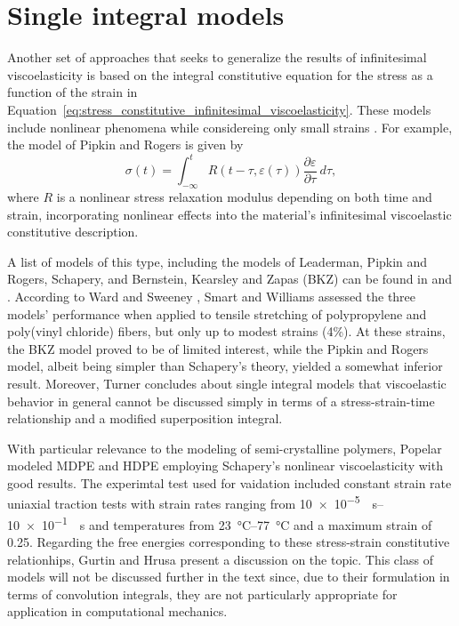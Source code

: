\section{Single integral models}
Another set of approaches that seeks to generalize the results of infinitesimal viscoelasticity is based on the integral constitutive equation for the stress as a function of the strain in Equation~\eqref{eq:stress_constitutive_infinitesimal_viscoelasticity}.
These models include nonlinear phenomena while considereing only small strains \citep{wardIntroductionMechanicalProperties2004}.
For example, the model of Pipkin and Rogers is given by \citep{wardIntroductionMechanicalProperties2004}
\begin{equation}
	\sigma(t) = \int_{-\infty}^t R(t-\tau, \varepsilon(\tau))\frac{\partial \varepsilon}{\partial \tau}\ d\tau,
\end{equation}
where $R$ is a nonlinear stress relaxation modulus depending on both time and strain, incorporating nonlinear effects into the material's infinitesimal viscoelastic constitutive description.

A list of models of this type, including the models of Leaderman, Pipkin and Rogers, Schapery, and Bernstein, Kearsley and Zapas (BKZ) can be found in \cite{wardIntroductionMechanicalProperties2004} and \cite{malkinRheologyConceptsMethods2017}.
According to Ward and Sweeney \citep{wardIntroductionMechanicalProperties2004}, Smart and Williams \citep{smartComparisonSingleintegralNonlinear1972} assessed the three models' performance when applied to tensile stretching of polypropylene and poly(vinyl chloride) fibers, but only up to modest strains (4\%).
At these strains, the BKZ model proved to be of limited interest, while the Pipkin and Rogers model, albeit being simpler than Schapery's theory, yielded a somewhat inferior result.
Moreover, Turner \citep{turnerStrainResponsePlastics1966} concludes about single integral models that viscoelastic behavior in general cannot be discussed simply in terms of a stress-strain-time relationship and a modified superposition integral.

With particular relevance to the modeling of semi-crystalline polymers, Popelar \citep{popelarViscoelasticMaterialCharacterization1990} modeled MDPE and HDPE employing Schapery's nonlinear viscoelasticity with good results.
The experimtal test used for vaidation included constant strain rate uniaxial traction tests with strain rates ranging from \SIrange{10e-5}{10e-1}{\per\second} and temperatures from \SIrange{23}{77}{\celsius} and a maximum strain of 0.25.
Regarding the free energies corresponding to these stress-strain constitutive relationhips, Gurtin and Hrusa \citep{gurtinEnergiesNonlinearViscoelastic1988} present a discussion on the topic.
This class of models will not be discussed further in the text since, due to their formulation in terms of convolution integrals, they are not particularly appropriate for application in computational mechanics.

